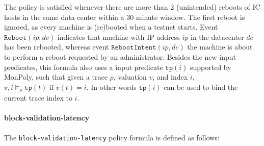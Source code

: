 \documentclass[a4paper,headings=normal]{scrartcl}
\newcommand*{\Pred}[1]{\mathtt{#1}}
\newcommand*{\Reboot}{\Pred{Reboot}}
\newcommand*{\RebootIntent}{\Pred{RebootIntent}}
\newcommand*{\tppred}{\Pred{tp}}
\newcommand*{\APL}{\texttt{block-validation-latency}}
\begin{document}
The policy is satisfied whenever there are more than 2 (unintended) reboots of IC hosts
in the same data center within a 30 minute window. The first reboot is ignored, as every
machine is (re)booted when a testnet starts. Event $\Reboot(ip,dc)$ indicates that machine
with IP address $ip$ in the datacenter $dc$ has been rebooted, whereas event $\RebootIntent(ip,dc)$
the machine is about to perform a reboot requested by an administrator.
Besides the new input predicates, this formula also uses a input predicate
$\tppred(i)$ supported by MonPoly, such that given a trace $\rho$, valuation $v$, and index
$i$, $v, i \models_\rho \tppred(t) \text{ if } v(t) = i$.
In other words $\tppred(i)$ can be used to bind the current trace index to $i$.


\paragraph{block-validation-latency}
The \APL{} policy formula is defined as follows:
\end{document}
